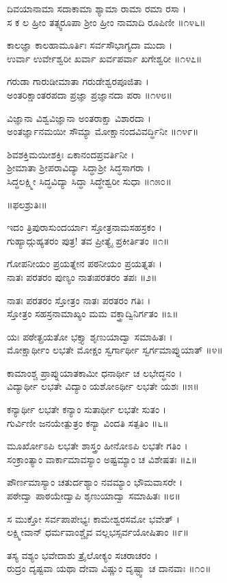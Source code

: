 ದಿವಯಾನಾಮಾ ಸದಾಕಾಮಾ ಶ್ಯಾಮಾ ರಾಮಾ ರಮಾ ರಸಾ ।\\
ಸ ಕ ಲ ಹ್ರೀಂ ತತ್ಸ್ವರೂಪಾ ಶ್ರೀಂ ಹ್ರೀಂ ನಾಮಾದಿ ರೂಪಿಣೀ ॥೧೪೬॥

ಕಾಲಜ್ಞಾ ಕಾಲಹಾಮೂರ್ತಿಃ ಸರ್ವಸೌಭಾಗ್ಯದಾ ಮುದಾ ।\\
ಉರ್ವಾ ಉರ್ವೇಶ್ವರೀ ಖರ್ವಾ ಖರ್ವಪರ್ವಾ ಖಗೇಶ್ವರೀ ॥೧೪೭॥

ಗರುಡಾ ಗಾರುಡೀಮಾತಾ ಗರುಡೇಶ್ವರಪೂಜಿತಾ ।\\
ಅಂತರಿಕ್ಷಾಂತರಪದಾ ಪ್ರಜ್ಞಾ ಪ್ರಜ್ಞಾನದಾ ಪರಾ ॥೧೪೮॥

ವಿಜ್ಞಾನಾ ವಿಶ್ವವಿಜ್ಞಾನಾ ಅಂತರಾಕ್ಷಾ ವಿಶಾರದಾ ।\\
ಅಂತರ್ಜ್ಞಾನಮಯೀ ಸೌಮ್ಯಾ ಮೋಕ್ಷಾನಂದವಿವರ್ದ್ಧಿನೀ ॥೧೪೯॥

ಶಿವಶಕ್ತಿಮಯೀಶಕ್ತಿಃ ಏಕಾನಂದಪ್ರವರ್ತಿನೀ ।\\
ಶ್ರೀಮಾತಾ ಶ್ರೀಪರಾವಿದ್ಯಾ ಸಿದ್ಧಾಶ್ರೀ ಸಿದ್ಧಸಾಗರಾ ।\\
ಸಿದ್ಧಲಕ್ಷ್ಮೀ ಸಿದ್ಧವಿದ್ಯಾ ಸಿದ್ಧಾ ಸಿದ್ಧೇಶ್ವರೀ ಸುಧಾ ॥೧೫೦॥

॥ಫಲಶ್ರುತಿಃ॥

ಇದಂ ತ್ರಿಪುರಾಸುಂದರ್ಯಾಃ ಸ್ತೋತ್ರನಾಮಸಹಸ್ರಕಂ ।\\
ಗುಹ್ಯಾದ್ಗುಹ್ಯತರಂ ಪುತ್ರ! ತವ ಪ್ರೀತ್ಯೈ ಪ್ರಕೀರ್ತಿತಂ ॥೧॥

ಗೋಪನೀಯಂ ಪ್ರಯತ್ನೇನ ಪಠನೀಯಂ ಪ್ರಯತ್ನತಃ ।\\
ನಾತಃ ಪರತರಂ ಪುಣ್ಯಂ ನಾತಃಪರತರಂ ತಪಃ ॥೨॥

ನಾತಃ ಪರತರಂ ಸ್ತೋತ್ರಂ ನಾತಃ ಪರತರಂ ಗತಿಃ ।\\
ಸ್ತೋತ್ರಂ ಸಹಸ್ರನಾಮಾಖ್ಯಂ ಮಮ ವಕ್ತ್ರಾದ್ವಿನಿರ್ಗತಂ ॥೩॥

ಯಃ ಪಠೇತ್ಪ್ರಯತೋ ಭಕ್ತ್ಯಾ ಶೃಣುಯಾದ್ವಾ ಸಮಾಹಿತಃ ।\\
ಮೋಕ್ಷಾರ್ಥೀಂ ಲಭತೇ ಮೋಕ್ಷಂ ಸ್ವರ್ಗಾರ್ಥೀ ಸ್ವರ್ಗಮಾಪ್ನುಯಾತ್ ॥೪॥

ಕಾಮಾಂಶ್ಚ ಪ್ರಾಪ್ನುಯಾತಕಾಮೀ ಧನಾರ್ಥೀ ಚ ಲಭೇದ್ಧನಂ ।\\
ವಿದ್ಯಾರ್ಥೀ ಲಭತೇ ವಿದ್ಯಾಂ ಯಶೋಽರ್ಥೀ ಲಭತೇ ಯಶಃ ॥೫॥

ಕನ್ಯಾರ್ಥೀ ಲಭತೇ ಕನ್ಯಾಂ ಸುತಾರ್ಥೀ ಲಭತೇ ಸುತಂ ।\\
ಗುರ್ವಿಣೀ ಜನಯೇತ್ಪುತ್ರಂ ಕನ್ಯಾ ವಿಂದತಿ ಸತ್ಪತಿಂ ॥೬॥

ಮೂರ್ಖೋಽಪಿ ಲಭತೇ ಶಾಸ್ತ್ರಂ ಹೀನೋಽಪಿ ಲಭತೇ ಗತಿಂ ।\\
ಸಂಕ್ರಾಂತ್ಯಾಂ ವಾರ್ಕಾಮಾವಸ್ಯಾಂ ಅಷ್ಟಮ್ಯಾಂ ಚ ವಿಶೇಷತಃ ॥೭॥

ಪೌರ್ಣಮಾಸ್ಯಾಂ ಚತುರ್ದಶ್ಯಾಂ ನವಮ್ಯಾಂ ಭೌಮವಾಸರೇ ।\\
ಪಠೇದ್ವಾ ಪಾಠಯೇದ್ವಾಪಿ ಶೃಣುಯಾದ್ವಾ ಸಮಾಹಿತಃ ॥೮॥

ಸ ಮುಕ್ತೋ ಸರ್ವಪಾಪೇಭ್ಯಃ ಕಾಮೇಶ್ವರಸಮೋ ಭವೇತ್ ।\\
ಲಕ್ಷ್ಮೀವಾನ್ ಧರ್ಮವಾಂಶ್ಚೈವ ವಲ್ಲಭಸ್ಸರ್ವಯೋಷಿತಾಂ ॥೯॥

ತಸ್ಯ ವಶ್ಯಂ ಭವೇದಾಶು ತ್ರೈಲೋಕ್ಯಂ ಸಚರಾಚರಂ ।\\
ರುದ್ರಂ ದೃಷ್ಟವಾ ಯಥಾ ದೇವಾ ವಿಷ್ಣುಂ ದೃಷ್ಟ್ವಾ ಚ ದಾನವಾಃ ॥೧೦॥

